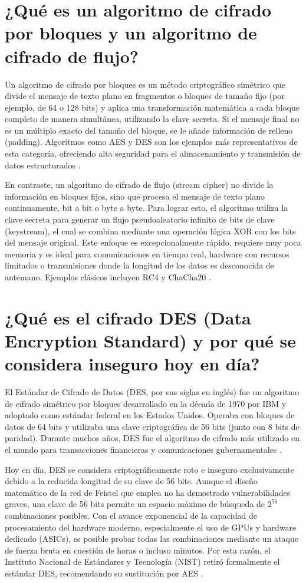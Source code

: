 \documentclass[a4paper,12pt]{article}
\begin{document}
\section{¿Qué es un algoritmo de cifrado por bloques y un algoritmo de cifrado de flujo?}

Un algoritmo de cifrado por bloques es un método criptográfico simétrico que divide el mensaje de texto plano en fragmentos o bloques de tamaño fijo (por ejemplo, de 64 o 128 bits) y aplica una transformación matemática a cada bloque completo de manera simultánea, utilizando la clave secreta. Si el mensaje final no es un múltiplo exacto del tamaño del bloque, se le añade información de relleno (padding). Algoritmos como AES y DES son los ejemplos más representativos de esta categoría, ofreciendo alta seguridad para el almacenamiento y transmisión de datos estructurados \cite{stallings2017}.

En contraste, un algoritmo de cifrado de flujo (stream cipher) no divide la información en bloques fijos, sino que procesa el mensaje de texto plano continuamente, bit a bit o byte a byte. Para lograr esto, el algoritmo utiliza la clave secreta para generar un flujo pseudoaleatorio infinito de bits de clave (keystream), el cual se combina mediante una operación lógica XOR con los bits del mensaje original. Este enfoque es excepcionalmente rápido, requiere muy poca memoria y es ideal para comunicaciones en tiempo real, hardware con recursos limitados o transmisiones donde la longitud de los datos es desconocida de antemano. Ejemplos clásicos incluyen RC4 y ChaCha20 \cite{forouzan2015}.

\section{¿Qué es el cifrado DES (Data Encryption Standard) y por qué se considera inseguro hoy en día?}

El Estándar de Cifrado de Datos (DES, por sus siglas en inglés) fue un algoritmo de cifrado simétrico por bloques desarrollado en la década de 1970 por IBM y adoptado como estándar federal en los Estados Unidos. Operaba con bloques de datos de 64 bits y utilizaba una clave criptográfica de 56 bits (junto con 8 bits de paridad). Durante muchos años, DES fue el algoritmo de cifrado más utilizado en el mundo para transacciones financieras y comunicaciones gubernamentales \cite{stallings2017}.

Hoy en día, DES se considera criptográficamente roto e inseguro exclusivamente debido a la reducida longitud de su clave de 56 bits. Aunque el diseño matemático de la red de Feistel que emplea no ha demostrado vulnerabilidades graves, una clave de 56 bits permite un espacio máximo de búsqueda de $2^{56}$ combinaciones posibles. Con el avance exponencial de la capacidad de procesamiento del hardware moderno, especialmente el uso de GPUs y hardware dedicado (ASICs), es posible probar todas las combinaciones mediante un ataque de fuerza bruta en cuestión de horas o incluso minutos. Por esta razón, el Instituto Nacional de Estándares y Tecnología (NIST) retiró formalmente el estándar DES, recomendando su sustitución por AES \cite{nist2001}.
\end{document}

